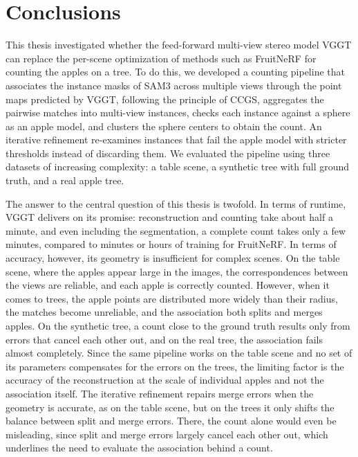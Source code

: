 \documentclass[english, egger, bsc]{vcethesis}
\begin{document}
\chapter{Conclusions}
This thesis investigated whether the feed-forward multi-view stereo model VGGT can replace the per-scene optimization of methods such as FruitNeRF for counting the apples on a tree. To do this, we developed a counting pipeline that associates the instance masks of SAM3 across multiple views through the point maps predicted by VGGT, following the principle of CCGS, aggregates the pairwise matches into multi-view instances, checks each instance against a sphere as an apple model, and clusters the sphere centers to obtain the count. An iterative refinement re-examines instances that fail the apple model with stricter thresholds instead of discarding them. We evaluated the pipeline using three datasets of increasing complexity: a table scene, a synthetic tree with full ground truth, and a real apple tree.

The answer to the central question of this thesis is twofold. In terms of runtime, VGGT delivers on its promise: reconstruction and counting take about half a minute, and even including the segmentation, a complete count takes only a few minutes, compared to minutes or hours of training for FruitNeRF. In terms of accuracy, however, its geometry is insufficient for complex scenes. On the table scene, where the apples appear large in the images, the correspondences between the views are reliable, and each apple is correctly counted. However, when it comes to trees, the apple points are distributed more widely than their radius, the matches become unreliable, and the association both splits and merges apples. On the synthetic tree, a count close to the ground truth results only from errors that cancel each other out, and on the real tree, the association fails almost completely. Since the same pipeline works on the table scene and no set of its parameters compensates for the errors on the trees, the limiting factor is the accuracy of the reconstruction at the scale of individual apples and not the association itself. The iterative refinement repairs merge errors when the geometry is accurate, as on the table scene, but on the trees it only shifts the balance between split and merge errors. There, the count alone would even be misleading, since split and merge errors largely cancel each other out, which underlines the need to evaluate the association behind a count.
\end{document}
